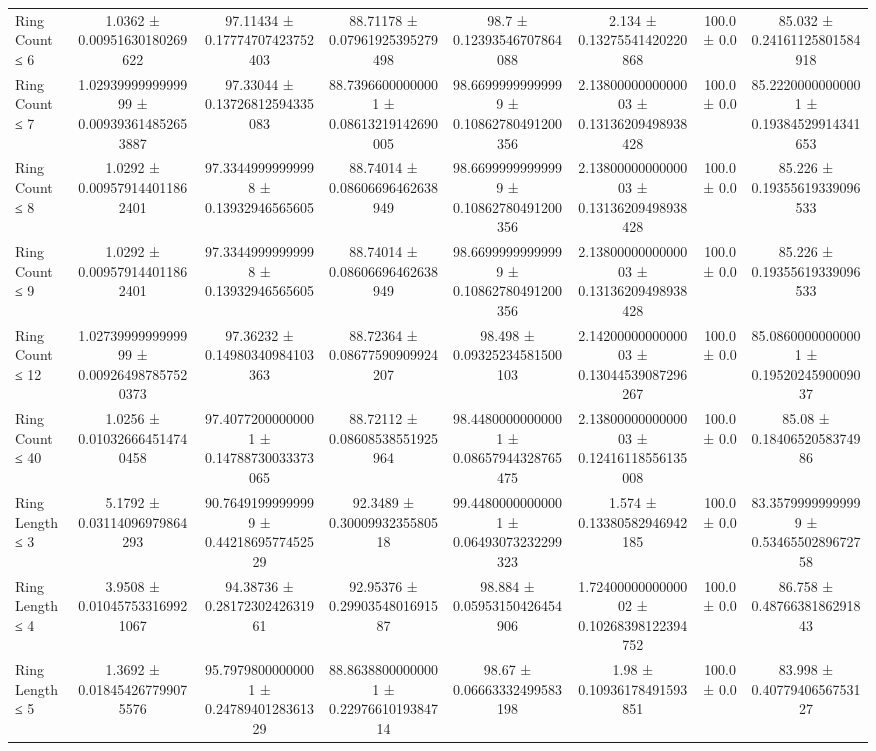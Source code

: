 \begin{table}[H]
\begin{tabular}{l c c c c c c c}
        Ring Count ≤ 6 & 1.0362 ± 0.00951630180269622 & 97.11434 ± 0.17774707423752403 & 88.71178 ± 0.07961925395279498 & 98.7 ± 0.12393546707864088 & 2.134 ± 0.13275541420220868 & 100.0 ± 0.0 & 85.032 ± 0.24161125801584918 \\
        Ring Count ≤ 7 & 1.0293999999999999 ± 0.009393614852653887 & 97.33044 ± 0.13726812594335083 & 88.73966000000001 ± 0.08613219142690005 & 98.66999999999999 ± 0.10862780491200356 & 2.1380000000000003 ± 0.13136209498938428 & 100.0 ± 0.0 & 85.22200000000001 ± 0.19384529914341653 \\
        Ring Count ≤ 8 & 1.0292 ± 0.009579144011862401 & 97.33449999999998 ± 0.13932946565605 & 88.74014 ± 0.08606696462638949 & 98.66999999999999 ± 0.10862780491200356 & 2.1380000000000003 ± 0.13136209498938428 & 100.0 ± 0.0 & 85.226 ± 0.19355619339096533 \\
        Ring Count ≤ 9 & 1.0292 ± 0.009579144011862401 & 97.33449999999998 ± 0.13932946565605 & 88.74014 ± 0.08606696462638949 & 98.66999999999999 ± 0.10862780491200356 & 2.1380000000000003 ± 0.13136209498938428 & 100.0 ± 0.0 & 85.226 ± 0.19355619339096533 \\
        Ring Count ≤ 12 & 1.0273999999999999 ± 0.009264987857520373 & 97.36232 ± 0.14980340984103363 & 88.72364 ± 0.08677590909924207 & 98.498 ± 0.09325234581500103 & 2.1420000000000003 ± 0.13044539087296267 & 100.0 ± 0.0 & 85.08600000000001 ± 0.1952024590009037 \\
        Ring Count ≤ 40 & 1.0256 ± 0.010326664514740458 & 97.40772000000001 ± 0.14788730033373065 & 88.72112 ± 0.08608538551925964 & 98.44800000000001 ± 0.08657944328765475 & 2.1380000000000003 ± 0.12416118556135008 & 100.0 ± 0.0 & 85.08 ± 0.1840652058374986 \\
        Ring Length ≤ 3 & 5.1792 ± 0.03114096979864293 & 90.76491999999999 ± 0.4421869577452529 & 92.3489 ± 0.3000993235580518 & 99.44800000000001 ± 0.06493073232299323 & 1.574 ± 0.13380582946942185 & 100.0 ± 0.0 & 83.35799999999999 ± 0.5346550289672758 \\
        Ring Length ≤ 4 & 3.9508 ± 0.010457533169921067 & 94.38736 ± 0.2817230242631961 & 92.95376 ± 0.2990354801691587 & 98.884 ± 0.05953150426454906 & 1.7240000000000002 ± 0.10268398122394752 & 100.0 ± 0.0 & 86.758 ± 0.4876638186291843 \\
        Ring Length ≤ 5 & 1.3692 ± 0.018454267799075576 & 95.79798000000001 ± 0.2478940128361329 & 88.86388000000001 ± 0.2297661019384714 & 98.67 ± 0.06663332499583198 & 1.98 ± 0.10936178491593851 & 100.0 ± 0.0 & 83.998 ± 0.4077940656753127 \\

\end{tabular}
\end{table}
